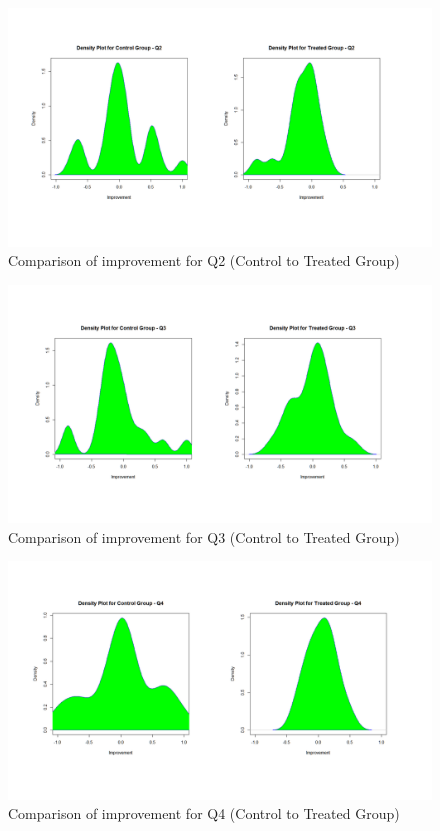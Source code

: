 \begin{figure}
	\centering
	\includegraphics[width=1\textwidth]{figures/Control-Treated_q2}
	\caption{Comparison of improvement for Q2 (Control to Treated Group)}
	\label{fig:Control-Treated_q2}
\end{figure}

\begin{figure}
	\centering
	\includegraphics[width=1\textwidth]{figures/Control-Treated_q3}
	\caption{Comparison of improvement for Q3 (Control to Treated Group)}
	\label{fig:Control-Treated_q3}
\end{figure}

\begin{figure}
	\centering
	\includegraphics[width=1\textwidth]{figures/Control-Treated_q4}
	\caption{Comparison of improvement for Q4 (Control to Treated Group)}
	\label{fig:Control-Treated_q4}
\end{figure}

